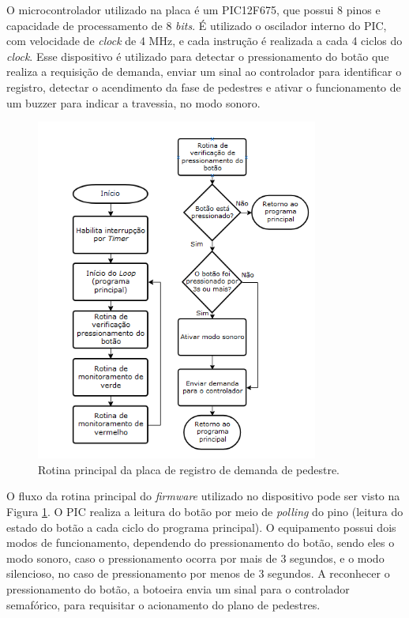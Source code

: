 O microcontrolador utilizado na placa é um PIC12F675, que possui 8 pinos e capacidade de processamento de 8 \textit{bits}. É utilizado o oscilador interno do PIC, com velocidade de \textit{clock} de 4 MHz, e cada instrução é realizada a cada 4 ciclos do \textit{clock}. Esse dispositivo é utilizado para detectar o pressionamento do botão que realiza a requisição de demanda, enviar um sinal ao controlador para identificar o registro, detectar o acendimento da fase de pedestres e ativar o funcionamento de um buzzer para indicar a travessia, no modo sonoro. 

\begin{figure}[ht]
    \begin{center}
    \includegraphics{figuras/fluxo_bot.PNG}
    \end{center}
    \caption[Fluxograma botoeira]{Rotina principal da placa de registro de demanda de pedestre.}
    \label{fluxo_bot}
\end{figure}

O fluxo da rotina principal do \textit{firmware} utilizado no dispositivo pode ser visto na Figura \ref{fluxo_bot}. O PIC realiza a leitura do botão por meio de \textit{polling} do pino (leitura do estado do botão a cada ciclo do programa principal). O equipamento possui dois modos de funcionamento, dependendo do pressionamento do botão, sendo eles o modo sonoro, caso o pressionamento ocorra por mais de 3 segundos, e o modo silencioso, no caso de pressionamento por menos de 3 segundos. A reconhecer o pressionamento do botão, a botoeira envia um sinal para o controlador semafórico, para requisitar o acionamento do plano de pedestres. 

